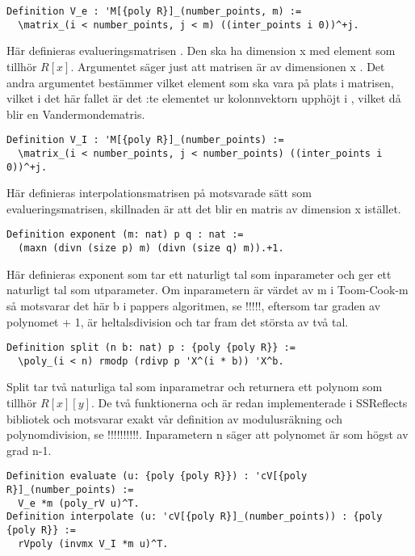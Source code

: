 \begin{lstlisting}
Definition V_e : 'M[{poly R}]_(number_points, m) :=
  \matrix_(i < number_points, j < m) ((inter_points i 0))^+j.
\end{lstlisting}

Här definieras evalueringsmatrisen . Den ska ha dimension
 x  med element som tillhör $R[x]$. Argumentet  säger just att matrisen är av dimensionen
 x . Det andra argumentet 
bestämmer vilket element som ska vara på plats  i matrisen, vilket i
det här fallet är det :te elementet ur kolonnvektorn 
upphöjt i , vilket då blir en Vandermondematris.

\begin{lstlisting}
Definition V_I : 'M[{poly R}]_(number_points) :=
  \matrix_(i < number_points, j < number_points) ((inter_points i 0))^+j.
\end{lstlisting}

Här definieras interpolationsmatrisen på motsvarade sätt som
evalueringsmatrisen, skillnaden är att det blir en matris av dimension
 x  istället.

\begin{lstlisting}
Definition exponent (m: nat) p q : nat :=
  (maxn (divn (size p) m) (divn (size q) m)).+1.
\end{lstlisting}

Här definieras exponent som tar ett naturligt tal  som inparameter och ger
ett naturligt tal som utparameter. Om inparametern är värdet av m i Toom-Cook-m
så motsvarar det här b i pappers algoritmen, se !!!!!, eftersom  tar
graden av polynomet + 1,  är heltalsdivision och  tar fram det
största av två tal.

\begin{lstlisting}
Definition split (n b: nat) p : {poly {poly R}} :=
  \poly_(i < n) rmodp (rdivp p 'X^(i * b)) 'X^b.
\end{lstlisting}

Split tar två naturliga tal som inparametrar och returnera ett polynom som
tillhör $R[x][y]$. De två funktionerna  och  är redan
implementerade i SSReflects bibliotek och motsvarar exakt vår definition av
modulusräkning och polynomdivision, se !!!!!!!!!!. Inparametern n säger att
polynomet är som högst av grad n-1.

\begin{lstlisting}
Definition evaluate (u: {poly {poly R}}) : 'cV[{poly R}]_(number_points) :=
  V_e *m (poly_rV u)^T.
Definition interpolate (u: 'cV[{poly R}]_(number_points)) : {poly {poly R}} :=
  rVpoly (invmx V_I *m u)^T.
\end{lstlisting}

